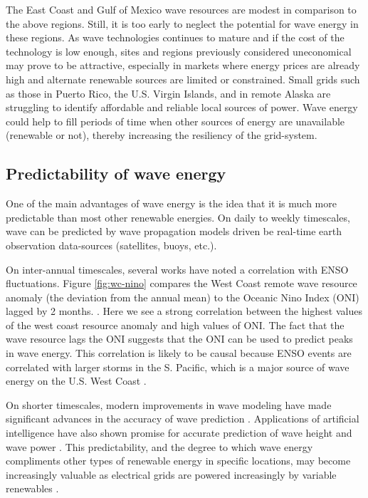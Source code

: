 The East Coast and Gulf of Mexico wave resources are modest in comparison to the above regions. Still, it is too early to neglect the potential for wave energy in these regions. As wave technologies continues to mature and if the cost of the technology is low enough, sites and regions previously considered uneconomical may prove to be attractive, especially in markets where energy prices are already high and alternate renewable sources are limited or constrained. Small grids such as those in Puerto Rico, the U.S. Virgin Islands, and in remote Alaska are struggling to identify affordable and reliable local sources of power. Wave energy could help to fill periods of time when other sources of energy are unavailable (renewable or not), thereby increasing the resiliency of the grid-system.

\subsection{Predictability of wave energy}
One of the main advantages of wave energy is the idea that it is much more predictable than most other renewable energies. On daily to weekly timescales, wave can be predicted by wave propagation models driven be real-time earth observation data-sources (satellites, buoys, etc.).

On inter-annual timescales, several works have noted a correlation with ENSO fluctuations. Figure \ref{fig:wc-nino} compares the West Coast remote wave resource anomaly (the deviation from the annual mean) to the Oceanic Nino Index (ONI) lagged by 2 months. \cite{nationaloceanicandatmosphericadministrationOceanicNinoIndex2020}.
Here we see a strong correlation between the highest values of the west coast resource anomaly and high values of ONI. The fact that the wave resource lags the ONI suggests that the ONI can be used to predict peaks in wave energy. This correlation is likely to be causal because ENSO events are correlated with larger storms in the S. Pacific, which is a major source of wave energy on the U.S. West Coast \citep{andersonClimateIndexOptimized2018, yangCharacteristicsVariabilityNearshore2020, ruggieroNationalAssessmentShoreline2013}.

On shorter timescales, modern improvements in wave modeling have made significant advances in the accuracy of wave prediction \citep{cavaleriWaveModellingCoastal2018}. Applications of artificial intelligence have also shown promise for accurate prediction of wave height and wave power \citep[e.g.][]{cornejo-bueno_significant_2016}. This predictability, and the degree to which wave energy compliments other types of renewable energy in specific locations, may become increasingly valuable as electrical grids are powered increasingly by variable renewables \cite{parkinsonIntegratingOceanWave2015}.

